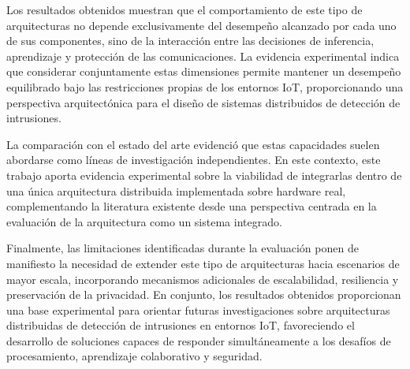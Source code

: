 \documentclass[journal,article,submit,moreauthors]{Definitions/mdpi}
\begin{document}
Los resultados obtenidos muestran que el comportamiento de este tipo de arquitecturas no depende exclusivamente del desempeño alcanzado por cada uno de sus componentes, sino de la interacción entre las decisiones de inferencia, aprendizaje y protección de las comunicaciones. La evidencia experimental indica que considerar conjuntamente estas dimensiones permite mantener un desempeño equilibrado bajo las restricciones propias de los entornos IoT, proporcionando una perspectiva arquitectónica para el diseño de sistemas distribuidos de detección de intrusiones.

La comparación con el estado del arte evidenció que estas capacidades suelen abordarse como líneas de investigación independientes. En este contexto, este trabajo aporta evidencia experimental sobre la viabilidad de integrarlas dentro de una única arquitectura distribuida implementada sobre hardware real, complementando la literatura existente desde una perspectiva centrada en la evaluación de la arquitectura como un sistema integrado.

Finalmente, las limitaciones identificadas durante la evaluación ponen de manifiesto la necesidad de extender este tipo de arquitecturas hacia escenarios de mayor escala, incorporando mecanismos adicionales de escalabilidad, resiliencia y preservación de la privacidad. En conjunto, los resultados obtenidos proporcionan una base experimental para orientar futuras investigaciones sobre arquitecturas distribuidas de detección de intrusiones en entornos IoT, favoreciendo el desarrollo de soluciones capaces de responder simultáneamente a los desafíos de procesamiento, aprendizaje colaborativo y seguridad.

\vspace{6pt} 



\end{document}
